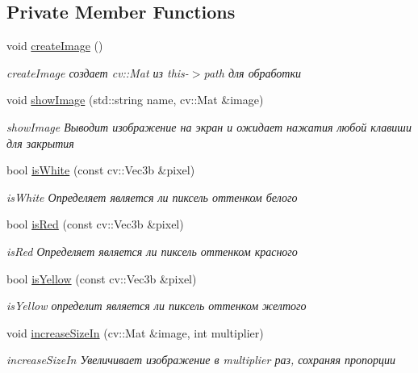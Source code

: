 \subsection*{Private Member Functions}
\begin{DoxyCompactItemize}
\item 
void \hyperlink{class_correction_addd8e0c7fbc69b9ba791d80659539731}{create\+Image} ()
\begin{DoxyCompactList}\small\item\em create\+Image создает cv\+::\+Mat из this-\/$>$path для обработки \end{DoxyCompactList}\item 
void \hyperlink{class_correction_a9ed7e4258c66b154f585f71815fd477b}{show\+Image} (std\+::string name, cv\+::\+Mat \&image)
\begin{DoxyCompactList}\small\item\em show\+Image Выводит изображение на экран и ожидает нажатия любой клавиши для закрытия \end{DoxyCompactList}\item 
bool \hyperlink{class_correction_a8f6f95589a0bb8df6815832155947390}{is\+White} (const cv\+::\+Vec3b \&pixel)
\begin{DoxyCompactList}\small\item\em is\+White Определяет является ли пиксель оттенком белого \end{DoxyCompactList}\item 
bool \hyperlink{class_correction_a1d3860fc36bdf0cb385de6061f87a6b8}{is\+Red} (const cv\+::\+Vec3b \&pixel)
\begin{DoxyCompactList}\small\item\em is\+Red Определяет является ли пиксель оттенком красного \end{DoxyCompactList}\item 
bool \hyperlink{class_correction_ac0ebbb080cf4ec47f02f3ac8d61f67df}{is\+Yellow} (const cv\+::\+Vec3b \&pixel)
\begin{DoxyCompactList}\small\item\em is\+Yellow определит является ли пиксель оттенком желтого \end{DoxyCompactList}\item 
void \hyperlink{class_correction_a5e8896ab6365772cbeb7f844edd3402d}{increase\+Size\+In} (cv\+::\+Mat \&image, int multiplier)
\begin{DoxyCompactList}\small\item\em increase\+Size\+In Увеличивает изображение в multiplier раз, сохраняя пропорции \end{DoxyCompactList}\item 

\end{DoxyCompactItemize}
